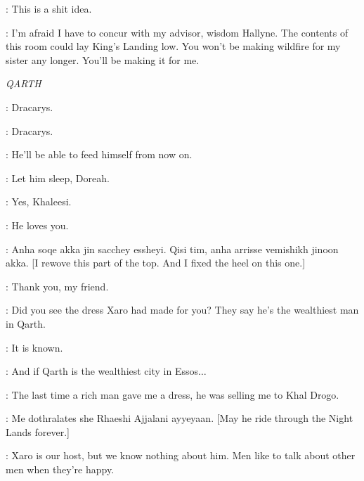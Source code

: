 \BRONN: This is a shit idea. 

\TYRION: I'm afraid I have to concur with my advisor, wisdom Hallyne. The contents of this room could lay King's Landing low. You won't be making wildfire for my sister any longer. You'll be making it for me. 


\scene

\textit{QARTH} 


\DAENERYS: Dracarys. 


\DAENERYS: Dracarys. 


\DAENERYS: He'll be able to feed himself from now on. 


\DAENERYS: Let him sleep, Doreah. 

\DOREAH: Yes, Khaleesi. 

\DAENERYS: He loves you. 


\IRRI:  Anha soqe akka jin sacchey essheyi. Qisi tim, anha arrisse vemishikh jinoon akka. [I rewove this part of the top. And I fixed the heel on this one.] 

\DAENERYS: Thank you, my friend. 


\DOREAH: Did you see the dress Xaro had made for you? They say he's the wealthiest man in Qarth. 

\IRRI: It is known. 

\DOREAH: And if Qarth is the wealthiest city in Essos$\ldots$  

\DAENERYS: The last time a rich man gave me a dress, he was selling me to Khal Drogo. 

\IRRI: Me dothralates she Rhaeshi Ajjalani ayyeyaan. [May he ride through the Night Lands forever.] 

\DAENERYS: Xaro is our host, but we know nothing about him. Men like to talk about other men when they're happy. 


